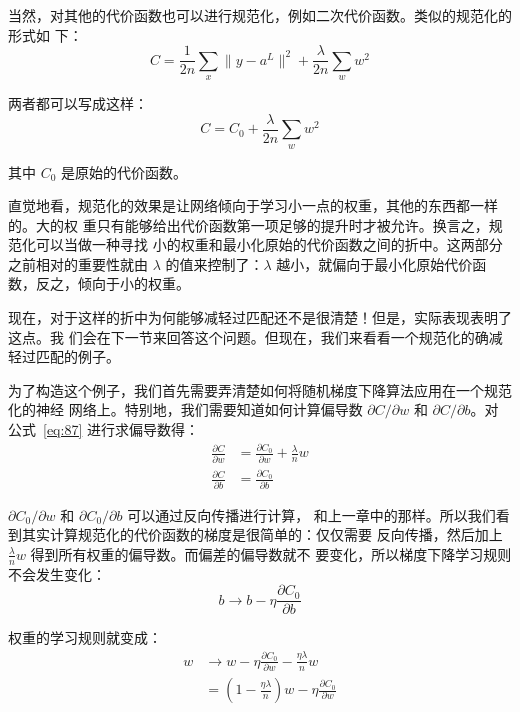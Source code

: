 当然，对其他的代价函数也可以进行规范化，例如二次代价函数。类似的规范化的形式如
下：
\begin{equation}
  C = \frac{1}{2n} \sum_x \|y-a^L\|^2 + \frac{\lambda}{2n} \sum_w w^2
  \label{eq:86}\tag{86}
\end{equation}

两者都可以写成这样：
\begin{equation}
  C = C_0 + \frac{\lambda}{2n} \sum_w w^2
  \label{eq:87}\tag{87}
\end{equation}

其中 $C_0$ 是原始的代价函数。

直觉地看，规范化的效果是让网络倾向于学习小一点的权重，其他的东西都一样的。大的权
重只有能够给出代价函数第一项足够的提升时才被允许。换言之，规范化可以当做一种寻找
小的权重和最小化原始的代价函数之间的折中。这两部分之前相对的重要性就由 $\lambda$
的值来控制了：$\lambda$ 越小，就偏向于最小化原始代价函数，反之，倾向于小的权重。

现在，对于这样的折中为何能够减轻过匹配还不是很清楚！但是，实际表现表明了这点。我
们会在下一节来回答这个问题。但现在，我们来看看一个规范化的确减轻过匹配的例子。

为了构造这个例子，我们首先需要弄清楚如何将随机梯度下降算法应用在一个规范化的神经
网络上。特别地，我们需要知道如何计算偏导数 $\partial C/\partial w$ 和
$\partial C/\partial b$。对公式~\eqref{eq:87} 进行求偏导数得：
\begin{align} 
  \frac{\partial C}{\partial w} & = \frac{\partial C_0}{\partial w} + 
                                  \frac{\lambda}{n} w \label{eq:88}\tag{88} \\ 
  \frac{\partial C}{\partial b} & = \frac{\partial C_0}{\partial b} \label{eq:89}\tag{89}
\end{align}

$\partial C_0/\partial w$ 和 $\partial C_0/\partial b$ 可以通过反向传播进行计算，
和上一章中的那样。所以我们看到其实计算规范化的代价函数的梯度是很简单的：仅仅需要
反向传播，然后加上 $\frac{\lambda}{n} w$ 得到所有权重的偏导数。而偏差的偏导数就不
要变化，所以梯度下降学习规则不会发生变化：
\begin{equation}
  b \rightarrow b -\eta \frac{\partial C_0}{\partial b}
  \label{eq:90}\tag{90}
\end{equation}

权重的学习规则就变成：
\begin{align} 
  w & \rightarrow w-\eta \frac{\partial C_0}{\partial
      w}-\frac{\eta \lambda}{n} w \label{eq:91}\tag{91}\\ 
    & = \left(1-\frac{\eta \lambda}{n}\right) w -\eta \frac{\partial
      C_0}{\partial w} \label{eq:92}\tag{92}
\end{align}

